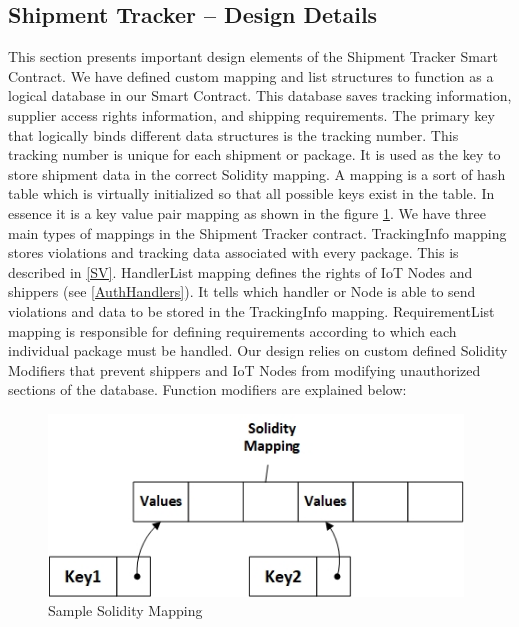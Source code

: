 
\subsection{Shipment Tracker – Design Details} \label{ST-SmartContract} 
This section presents important design elements of the Shipment Tracker Smart Contract. We have defined custom mapping and list structures to function as a logical database in our Smart Contract. This database saves tracking information, supplier access rights information, and shipping requirements. The primary key that logically binds different data structures is the tracking number. This tracking number is unique for each shipment or package. It is used as the key to store shipment data in the correct Solidity mapping. A mapping is a sort of hash table which is virtually initialized so that all possible keys exist in the table. In essence it is a key value pair mapping as shown in the figure \ref{fig:Sol-Mapping}. We have three main types of mappings in the Shipment Tracker contract. TrackingInfo mapping stores violations and tracking data associated with every package. This is described in \ref{SV}. HandlerList mapping defines the rights of IoT Nodes and shippers (see \ref{AuthHandlers}). It tells which handler or Node is able to send violations and data to be stored in the TrackingInfo mapping. RequirementList mapping is responsible for defining requirements according to which each individual package must be handled. Our design relies on custom defined Solidity Modifiers that prevent shippers and IoT Nodes from modifying unauthorized sections of the database. Function modifiers are explained below:

\begin{figure}[h]
	\centering
    \includegraphics[width=110mm,scale=1]{figs/Sol-Mapping}
	\caption{Sample Solidity Mapping}
	\label{fig:Sol-Mapping} 
\end{figure}

